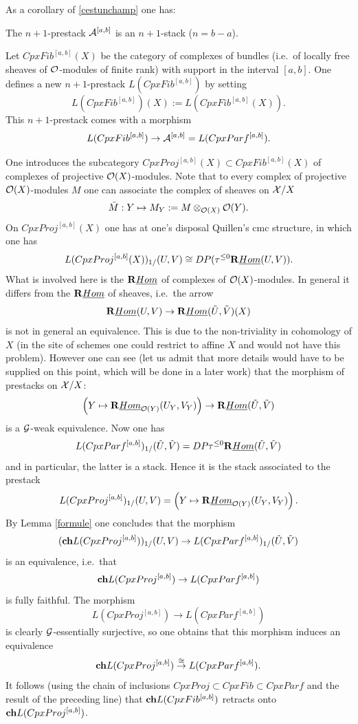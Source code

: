 As a corollary of \ref{cestunchamp} one has:

\begin{proposition}
\label{intro1}
The $n+1$-prestack ${\cal  A}^{[a,b]}$ is an $n+1$-stack ($n=b-a$).
\end{proposition}
\eop

Let $CpxFib^{[a,b]}(X)$ be the category of complexes of bundles
(i.e.\ of locally free sheaves of ${\cal O}$-modules of finite rank) with support
in the interval $[a,b]$. One defines a new $n+1$-prestack
$L(CpxFib^{[a,b]})$ by setting
$$
L(CpxFib^{[a,b]})(X):= L(CpxFib^{[a,b]}(X)).
$$
This $n+1$-prestack comes with a morphism
$$
L(CpxFib^{[a,b]})\rightarrow {\cal  A}^{[a,b]}=L(CpxParf^{[a,b]}).
$$

One introduces the subcategory $CpxProj^{[a,b]}(X)\subset CpxFib^{[a,b]}(X)$
of complexes of projective ${\cal O} (X)$-modules. Note that to every complex
of projective ${\cal O} (X)$-modules $M$ one can associate the complex of sheaves
on ${\cal X}/X$
$$
\tilde{M}:Y\mapsto M_Y:= M\otimes _{{\cal O}
(X)}{\cal O} (Y).
$$
On $CpxProj^{[a,b]}(X)$ one has at one's disposal Quillen's
cmc structure, in which one has
$$
L(CpxProj^{[a,b]}(X))_{1/}(U,V)
\cong DP(\tau ^{\leq 0} {\bf R} \underline{Hom} (U,V)).
$$
What is involved here is the ${\bf R} \underline{Hom}$ of complexes of
${\cal O} (X)$-modules. In general it differs from the
${\bf R} \underline{Hom}$ of sheaves, i.e.\ the arrow
$$
{\bf R} \underline{Hom} (U,V) \rightarrow {\bf R} \underline{Hom}
(\tilde{U},\tilde{V}) (X)
$$
is not in general an equivalence. This is due to the non-triviality
in cohomology of $X$ (in the site of schemes one could restrict
to affine $X$ and would not have this problem). However one can see
(let us admit that more details would have to be supplied on this point,
which will be done in a later work) that the morphism of prestacks on ${\cal X} /X$:
$$
\left( Y\mapsto {\bf R} \underline{Hom} _{{\cal O} (Y)}(U_Y,V_Y)\right)
\rightarrow {\bf R} \underline{Hom}
(\tilde{U},\tilde{V})
$$
is a ${\cal G}$-weak equivalence. Now one has
$$
L(CpxParf^{[a,b]})_{1/}(\tilde{U}, \tilde{V})=
DP \tau ^{\leq 0}{\bf R} \underline{Hom}
(\tilde{U},\tilde{V})
$$
and in particular, the latter is a stack. Hence it is the stack associated
to the prestack
$$
L(CpxProj^{[a,b]})_{1/}(U,V) =
\left( Y\mapsto {\bf R} \underline{Hom} _{{\cal O} (Y)}(U_Y,V_Y)\right) .
$$
By Lemma \ref{formule} one concludes that the morphism
$$
({\bf ch}L(CpxProj^{[a,b]}))_{1/}(U,V) \rightarrow
L(CpxParf^{[a,b]})_{1/}(\tilde{U}, \tilde{V})
$$
is an equivalence, i.e.\ that
$$
{\bf ch}L(CpxProj^{[a,b]})\rightarrow L(CpxParf^{[a,b]})
$$
is fully faithful. The morphism
$$
L(CpxProj^{[a,b]})\rightarrow L(CpxParf^{[a,b]})
$$
is clearly ${\cal G}$-essentially surjective, so one obtains that this
morphism induces an equivalence
$$
{\bf ch}L(CpxProj^{[a,b]})\stackrel{\cong}{\rightarrow} L(CpxParf^{[a,b]}).
$$
It follows
(using the chain of inclusions $CpxProj \subset CpxFib \subset CpxParf$
and the result of the preceding line) that ${\bf ch}L(CpxFib^{[a,b]})$
retracts onto ${\bf ch}L(CpxProj^{[a,b]})$.


